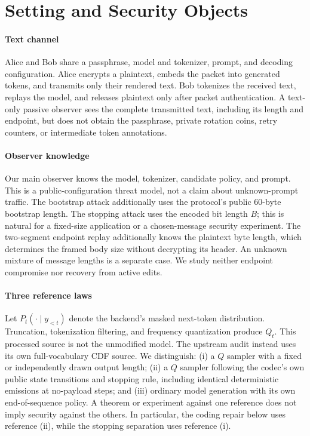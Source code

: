 \section{Setting and Security Objects}
\label{sec:setting}

\paragraph{Text channel}
Alice and Bob share a passphrase, model and tokenizer, prompt, and decoding
configuration. Alice encrypts a plaintext, embeds the packet into generated
tokens, and transmits only their rendered text. Bob tokenizes the received text,
replays the model, and releases plaintext only after packet authentication.
A text-only passive observer sees the complete transmitted text, including its
length and endpoint, but does not obtain the passphrase, private rotation coins,
retry counters, or intermediate token annotations.

\paragraph{Observer knowledge}
Our main observer knows the model, tokenizer, candidate policy, and prompt.
This is a public-configuration threat model, not a claim about unknown-prompt
traffic. The bootstrap attack additionally uses the protocol's public 60-byte
bootstrap length. The stopping attack uses the encoded bit length $B$; this is
natural for a fixed-size application or a chosen-message security experiment.
The two-segment endpoint replay additionally knows the plaintext byte length,
which determines the framed body size without decrypting its header.
An unknown mixture of message lengths is a separate case. We study neither
endpoint compromise nor recovery from active edits.

\paragraph{Three reference laws}
Let $P_t(\cdot\mid y_{<t})$ denote the backend's masked next-token distribution.
Truncation, tokenization filtering, and frequency quantization produce $Q_t$.
This processed source is not the unmodified model. The upstream audit instead
uses its own full-vocabulary CDF source. We distinguish:
(i) a $Q$ sampler with a fixed or independently drawn output length;
(ii) a $Q$ sampler following the codec's own public state transitions and stopping
rule, including identical deterministic emissions at no-payload steps; and
(iii) ordinary model generation with its own end-of-sequence policy.
A theorem or experiment against one reference does not imply security against
the others. In particular, the coding repair below uses reference (ii), while
the stopping separation uses reference (i).

